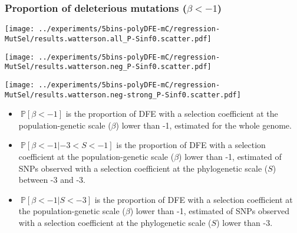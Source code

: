 \documentclass{article}
\newcommand{\proba}{\mathbb{P}}
\newcommand{\Sphy}{S}
\newcommand{\divStrongDel}{\Sphy < -3}
\newcommand{\divDel}{-3 < \Sphy < -1}
\newcommand{\Spop}{\beta}
\newcommand{\polyDel}{\Spop < -1}
\begin{document}
    \subsubsection{Proportion of deleterious mutations ($\polyDel$)}\label{subsec:proportion-deleterious-mutations}
    \begin{minipage}{0.32\linewidth}
        \texttt{[image: ../experiments/5bins-polyDFE-mC/regression-MutSel/results.watterson.all\_P-Sinf0.scatter.pdf]}
    \end{minipage}
    \begin{minipage}{0.32\linewidth}
        \texttt{[image: ../experiments/5bins-polyDFE-mC/regression-MutSel/results.watterson.neg\_P-Sinf0.scatter.pdf]}
    \end{minipage}
    \begin{minipage}{0.32\linewidth}
        \texttt{[image: ../experiments/5bins-polyDFE-mC/regression-MutSel/results.watterson.neg-strong\_P-Sinf0.scatter.pdf]}
    \end{minipage}
    \begin{itemize}
        \item $\ \proba [ \polyDel ]$ is the proportion of DFE with a selection coefficient at the population-genetic scale ($\Spop$) lower than -1, estimated for the whole genome.
        \item $\ \proba [ \polyDel | \divDel]$ is the proportion of DFE with a selection coefficient at the population-genetic scale ($\Spop$) lower than -1, estimated of SNPs observed with a selection coefficient at the phylogenetic scale ($\Sphy$) between -3 and -3.
        \item $\ \proba [ \polyDel | \divStrongDel ]$ is the proportion of DFE with a selection coefficient at the population-genetic scale ($\Spop$) lower than -1, estimated of SNPs observed with a selection coefficient at the phylogenetic scale ($\Sphy$) lower than -3.
    \end{itemize}
\end{document}
